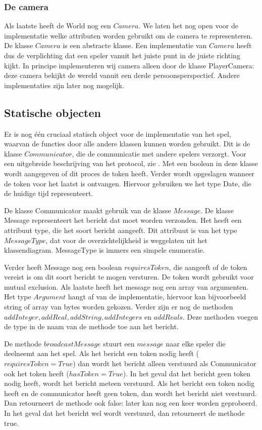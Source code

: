     \subsubsection{De camera}
    Als laatste heeft de World nog een $Camera$. We laten het nog open voor de implementatie welke attributen worden gebruikt om de camera te representeren. De klasse $Camera$ is een abstracte klasse. Een implementatie van $Camera$ heeft dus de verplichting dat een speler vanuit het juiste punt in de juiste richting kijkt. In principe implementeren wij camera alleen door de klasse PlayerCamera: deze camera bekijkt de wereld vanuit een derde persoonsperspectief. Andere implementaties zijn later nog mogelijk.

    \subsection{Statische objecten}
    Er is nog \'e\'en cruciaal statisch object voor de implementatie van het spel, waarvan de functies door alle andere klassen kunnen worden gebruikt. Dit is de klasse $Communicator$, die de communicatie met andere spelers verzorgt.  Voor een uitgebreide beschrijving van het protocol, zie \protoref. Met een boolean in deze klasse wordt aangegeven of dit proces de token heeft. Verder wordt opgeslagen wanneer de token voor het laatst is ontvangen. Hiervoor gebruiken we het type Date, die de huidige tijd representeert.

    De klasse Communicator maakt gebruik van de klasse $Message$. De klasse Message representeert het bericht dat moet worden verzonden. Het heeft een attribuut type, die het soort bericht aangeeft. Dit attribuut is van het type $MessageType$, dat voor de overzichtelijkheid is weggelaten uit het klassendiagram. MessageType is immers een simpele enumeratie.

    Verder heeft Message nog een boolean $requiresToken$, die aangeeft of de token vereist is om dit soort bericht te mogen versturen. De token wordt gebruikt voor mutual exclusion. Als laatste heeft het message nog een array van argumenten. Het type $Argument$ hangt af van de implementatie, hiervoor kan bijvoorbeeld string of array van bytes worden gekozen. Verder zijn er nog de methoden $addInteger, addReal, addString, addIntegers$ en $addReals$. Deze methoden voegen de type in de naam van de methode toe aan het bericht.

    De methode $broadcastMessage$ stuurt een $message$ naar elke speler die deelneemt aan het spel. Als het bericht een token nodig heeft ($requiresToken = True$) dan wordt het bericht alleen verstuurd als Communicator ook het token heeft ($hasToken = True$). In het geval dat het bericht geen token nodig heeft, wordt het bericht meteen verstuurd. Als het bericht een token nodig heeft en de communicator heeft geen token, dan wordt het bericht niet verstuurd. Dan retourneert de methode ook false: later kan nog een keer worden geprobeerd. In het geval dat het bericht wel wordt verstuurd, dan retourneert de methode true.

